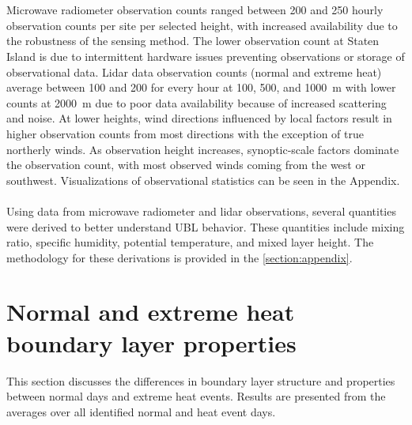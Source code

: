 \\ \\
Microwave radiometer observation counts ranged between 200 and 250 hourly observation counts per site per selected height, with increased availability due to the robustness of the sensing method. The lower observation count at Staten Island is due to intermittent hardware issues preventing observations or storage of observational data. Lidar data observation counts (normal and extreme heat) average between 100 and 200 for every hour at 100, 500, and \SI{1000}{\meter} with lower counts at \SI{2000}{\meter} due to poor data availability because of increased scattering and noise. At lower heights, wind directions influenced by local factors result in higher observation counts from most directions with the exception of true northerly winds. As observation height increases, synoptic-scale factors dominate the observation count, with most observed winds coming from the west or southwest. Visualizations of observational statistics can be seen in the Appendix.
\\ \\
Using data from microwave radiometer and lidar observations, several quantities were derived to better understand UBL behavior. These quantities include mixing ratio, specific humidity, potential temperature, and mixed layer height. The methodology for these derivations is provided in the \ref{section:appendix}.

\section{Normal and extreme heat boundary layer properties} \label{section:normal_extreme_properties}
This section discusses the differences in boundary layer structure and properties between normal days and extreme heat events. Results are presented from the averages over all identified normal and heat event days.

